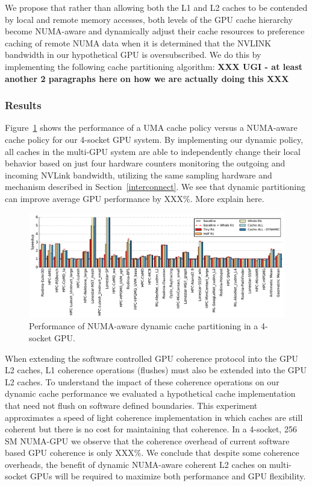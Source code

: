 We propose that rather than allowing both the L1 and L2 caches to be contended by local
and remote memory accesses,  both levels of the GPU cache hierarchy become NUMA-aware
and dynamically adjust their cache resources to preference caching of remote NUMA
data when it is determined that the NVLINK bandwidth in our hypothetical GPU is
oversubscribed.  We do this by implementing the following cache partitioning
algorithm:  \textbf{XXX UGI - at least another 2 paragraphs here on how we are actually doing this XXX}
\vspace{5in}

\subsubsection{Results}

Figure~\ref{fig:dynamiccaching} shows the performance of a UMA cache policy versus
a NUMA-aware cache policy for our 4-socket GPU system.  By implementing our dynamic
policy, all caches in the multi-GPU system are able to independently change their local
behavior based on just four hardware counters monitoring the outgoing and incoming
NVLink bandwidth, utilizing the same sampling hardware and mechanism described in 
Section~\ref{interconnect}.  We see that dynamic partitioning can improve average GPU
performance by XXX\%.  More explain here.

\begin{figure}[tp]
    \centering
    \includegraphics[width=1.0\columnwidth]{figures/plot_remote_cache_WB.pdf}
    \caption{Performance of NUMA-aware dynamic cache partitioning in a 4-socket GPU.}
    \label{fig:dynamiccaching}
\end{figure}

When extending the software controlled GPU coherence protocol into the GPU L2 caches,
L1 coherence operations (flushes) must also be extended into the GPU L2 caches.  To understand
the impact of these coherence operations on our dynamic cache performance we evaluated a hypothetical
cache implementation that need not flush on software defined boundaries.  This experiment
approximates a speed of light coherence implementation in which caches are still coherent but
there is no cost for maintaining that coherence.  In a 4-socket, 256 SM NUMA-GPU we observe
that the coherence overhead of current software based GPU coherence is only XXX\%.  We conclude
that despite some coherence overheads, the benefit of dynamic NUMA-aware coherent L2 caches
on multi-socket GPUs will be required to maximize both performance and GPU flexibility.

